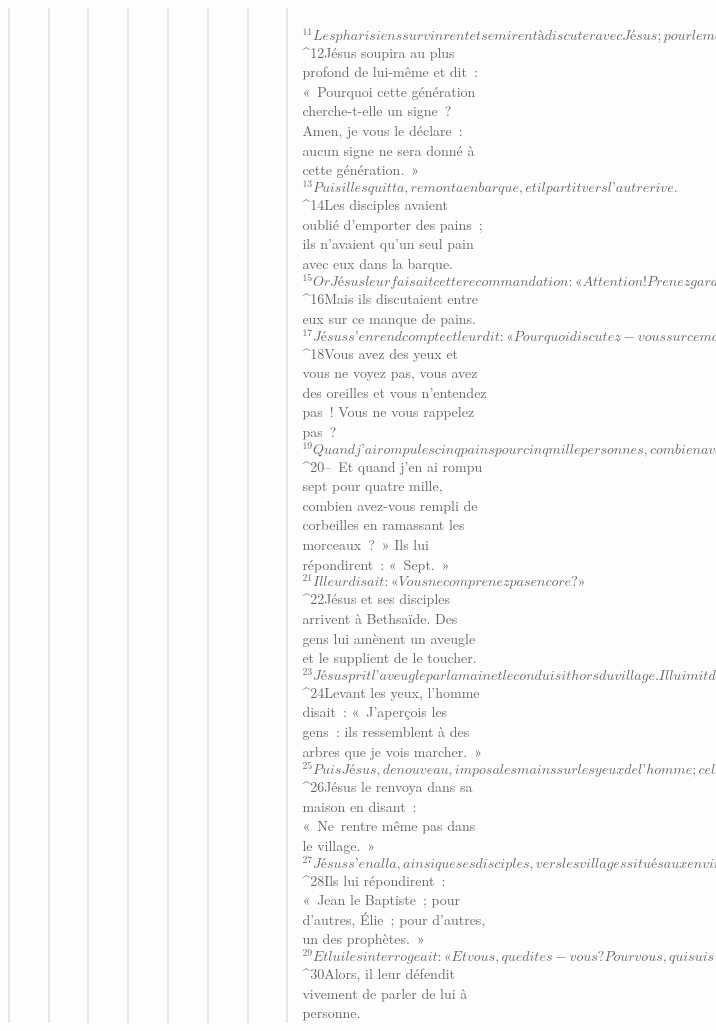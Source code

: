 \begin{verse}
\begin{verse}
\begin{verse}
\begin{verse}
\begin{verse}
\begin{verse}
\begin{verse}
\begin{verse}
         
${}^{11}Les pharisiens survinrent et se mirent à discuter avec Jésus ; pour le mettre à l’épreuve, ils cherchaient à obtenir de lui un signe venant du ciel. 
${}^{12}Jésus soupira au plus profond de lui-même et dit : « Pourquoi cette génération cherche-t-elle un signe ? Amen, je vous le déclare : aucun signe ne sera donné à cette génération. » 
${}^{13}Puis il les quitta, remonta en barque, et il partit vers l’autre rive.
${}^{14}Les disciples avaient oublié d’emporter des pains ; ils n’avaient qu’un seul pain avec eux dans la barque. 
${}^{15}Or Jésus leur faisait cette recommandation : « Attention ! Prenez garde au levain des pharisiens et au levain d’Hérode ! » 
${}^{16}Mais ils discutaient entre eux sur ce manque de pains. 
${}^{17}Jésus s’en rend compte et leur dit : « Pourquoi discutez-vous sur ce manque de pains ? Vous ne saisissez pas ? Vous ne comprenez pas encore ? Vous avez le cœur endurci ? 
${}^{18}Vous avez des yeux et vous ne voyez pas, vous avez des oreilles et vous n’entendez pas ! Vous ne vous rappelez pas ? 
${}^{19}Quand j’ai rompu les cinq pains pour cinq mille personnes, combien avez-vous ramassé de paniers pleins de morceaux ? » Ils lui répondirent : « Douze. 
${}^{20}– Et quand j’en ai rompu sept pour quatre mille, combien avez-vous rempli de corbeilles en ramassant les morceaux ? » Ils lui répondirent : « Sept. » 
${}^{21}Il leur disait : « Vous ne comprenez pas encore ? »
${}^{22}Jésus et ses disciples arrivent à Bethsaïde. Des gens lui amènent un aveugle et le supplient de le toucher. 
${}^{23}Jésus prit l’aveugle par la main et le conduisit hors du village. Il lui mit de la salive sur les yeux et lui imposa les mains. Il lui demandait : « Aperçois-tu quelque chose ? » 
${}^{24}Levant les yeux, l’homme disait : « J’aperçois les gens : ils ressemblent à des arbres que je vois marcher. » 
${}^{25}Puis Jésus, de nouveau, imposa les mains sur les yeux de l’homme ; celui-ci se mit à voir normalement, il se trouva guéri, et il distinguait tout avec netteté. 
${}^{26}Jésus le renvoya dans sa maison en disant : « Ne rentre même pas dans le village. »
${}^{27}Jésus s’en alla, ainsi que ses disciples, vers les villages situés aux environs de Césarée-de-Philippe. Chemin faisant, il interrogeait ses disciples : « Au dire des gens, qui suis-je ? » 
${}^{28}Ils lui répondirent : « Jean le Baptiste ; pour d’autres, Élie ; pour d’autres, un des prophètes. » 
${}^{29}Et lui les interrogeait : « Et vous, que dites-vous ? Pour vous, qui suis-je ? » Pierre, prenant la parole, lui dit : « Tu es le Christ. » 
${}^{30}Alors, il leur défendit vivement de parler de lui à personne.

\end{verse}
\end{verse}
\end{verse}
\end{verse}
\end{verse}
\end{verse}
\end{verse}
\end{verse}
